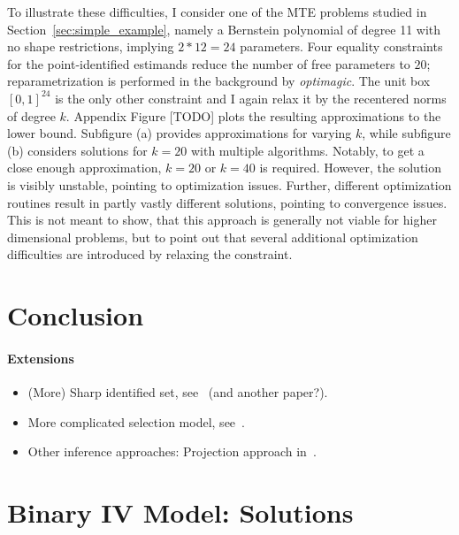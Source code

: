 \documentclass[12pt,a4paper,english]{article} %
\numberwithin{equation}{section}
\theoremstyle{definition}
\theoremstyle{remark}
\theoremstyle{plain}
\begin{document}
To illustrate these difficulties, I consider one of the MTE problems studied in Section~\ref{sec:simple_example}, namely a Bernstein polynomial of degree 11 with no shape restrictions, implying $2*12=24$ parameters.
Four equality constraints for the point-identified estimands reduce the number of free parameters to $20$; reparametrization is performed in the background by \textit{optimagic}.
The unit box $[0,1]^{24}$ is the only other constraint and I again relax it by the recentered norms of degree $k$.
Appendix Figure [TODO] plots the resulting approximations to the lower bound.
Subfigure (a) provides approximations for varying $k$, while subfigure (b) considers solutions for $k=20$ with multiple algorithms.
Notably, to get a close enough approximation, $k=20$ or $k=40$ is required. However, the solution is visibly unstable, pointing to optimization issues.
Further, different optimization routines result in partly vastly different solutions, pointing to convergence issues.
This is not meant to show, that this approach is generally not viable for higher dimensional problems, but to point out that several additional optimization difficulties are introduced by relaxing the constraint.


\section{Conclusion}

\paragraph{Extensions}
\begin{itemize}
  \item (More) Sharp identified set, see~\cite{marx2024sharp} (and another paper?).
  \item More complicated selection model, see~\cite{dutz2021selection}.
  \item Other inference approaches: Projection approach in~\cite{bei2023inference}.
\end{itemize}

\clearpage
\newpage






\appendix
{}


\section{Binary IV Model: Solutions}
\end{document}
